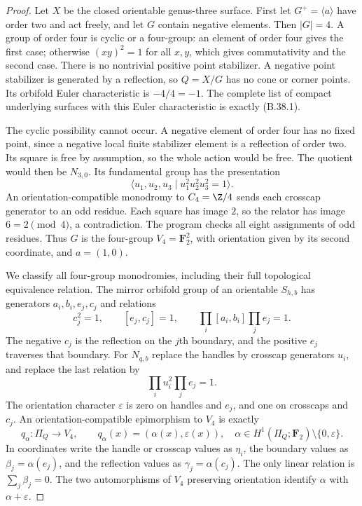 \begin{proof}
Let $X$ be the closed orientable genus-three surface.  First let
$G^+=\langle a\rangle$ have order two and act freely, and let
$G$ contain negative elements.  Then $|G|=4$.
A group of order four is cyclic or a four-group: an element of
order four gives the first case; otherwise $(xy)^2=1$ for all
$x,y$, which gives commutativity and the second case.
There is no nontrivial positive point stabilizer.
A negative point stabilizer is generated by a reflection, so
$Q=X/G$ has no cone or corner points.  Its orbifold Euler
characteristic is $-4/4=-1$.  The complete list of compact
underlying surfaces with this Euler characteristic is exactly
(B.38.1).

The cyclic possibility cannot occur.  A negative element of
order four has no fixed point, since a negative local finite
stabilizer element is a reflection of order two.  Its square
is free by assumption, so the whole action would be free.
The quotient would then be $N_{3,0}$.
Its fundamental group has the presentation
\[
 \langle u_1,u_2,u_3\mid u_1^2u_2^2u_3^2=1\rangle .
\]
An orientation-compatible monodromy to $C_4=\Z/4$ sends each
crosscap generator to an odd residue.  Each square has image
$2$, so the relator has image $6=2\pmod4$, a contradiction.
The program checks all eight assignments of odd residues.
Thus $G$ is the four-group
$V_4=\mathbf F_2^2$, with orientation given by its second
coordinate, and $a=(1,0)$.

We classify all four-group monodromies, including their full
topological equivalence relation.  The mirror orbifold group
of an orientable $S_{h,b}$ has generators
$a_i,b_i,e_j,c_j$ and relations
\[
 c_j^2=1,\qquad[e_j,c_j]=1,\qquad
 \prod_i[a_i,b_i]\prod_je_j=1.                         \tag{B.38.3}
\]
The negative $c_j$ is the reflection on the $j$th boundary,
and the positive $e_j$ traverses that boundary.
For $N_{q,b}$ replace the handles by crosscap generators
$u_i$, and replace the last relation by
\[
                         \prod_i u_i^2\prod_j e_j=1.  \tag{B.38.4}
\]
The orientation character $\varepsilon$ is zero on handles
and $e_j$, and one on crosscaps and $c_j$.
An orientation-compatible epimorphism to $V_4$ is exactly
\[
 q_\alpha:\Pi_Q\longrightarrow V_4,\qquad
 q_\alpha(x)=(\alpha(x),\varepsilon(x)),
 \quad
 \alpha\in H^1(\Pi_Q;\mathbf F_2)
       \setminus\{0,\varepsilon\}.                   \tag{B.38.5}
\]
In coordinates write the handle or crosscap values as $\eta_i$,
the boundary values as $\beta_j=\alpha(e_j)$, and the reflection
values as $\gamma_j=\alpha(c_j)$.
The only linear relation is
$\sum_j\beta_j=0$.
The two automorphisms of $V_4$ preserving orientation identify
$\alpha$ with $\alpha+\varepsilon$.


\end{proof}
